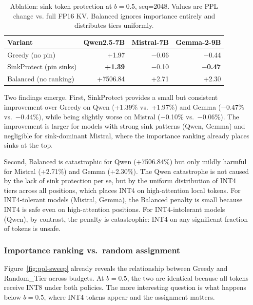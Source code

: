 \documentclass[11pt]{article}
\newcommand{\budget}{b}
\newcommand{\pct}{\%}
\theoremstyle{plain}
\theoremstyle{definition}
\begin{document}
\begin{table}[t]
\centering
\caption{Ablation: sink token protection at $\budget=0.5$, seq=2048.  Values are PPL change vs. full FP16 KV.  Balanced ignores importance entirely and distributes tiers uniformly.}
\label{tab:ablation-sink}
\small
\begin{tabular}{lrrr}
\toprule
Variant & Qwen2.5-7B & Mistral-7B & Gemma-2-9B \\
\midrule
Greedy (no pin) & +1.97 & $-$0.06 & $-$0.44 \\
SinkProtect (pin sinks) & \textbf{+1.39} & $-$0.10 & \textbf{$-$0.47} \\
Balanced (no ranking) & +7506.84 & +2.71 & +2.30 \\
\bottomrule
\end{tabular}
\end{table}

Two findings emerge.  First, SinkProtect provides a small but consistent improvement over Greedy on Qwen (+1.39\pct{} vs.\ +1.97\pct{}) and Gemma ($-$0.47\pct{} vs.\ $-$0.44\pct{}), while being slightly worse on Mistral ($-$0.10\pct{} vs.\ $-$0.06\pct{}).  The improvement is larger for models with strong sink patterns (Qwen, Gemma) and negligible for sink-dominant Mistral, where the importance ranking already places sinks at the top.

Second, Balanced is catastrophic for Qwen (+7506.84\pct{}) but only mildly harmful for Mistral (+2.71\pct{}) and Gemma (+2.30\pct{}).  The Qwen catastrophe is not caused by the lack of sink protection per se, but by the uniform distribution of INT4 tiers across all positions, which places INT4 on high-attention local tokens.  For INT4-tolerant models (Mistral, Gemma), the Balanced penalty is small because INT4 is safe even on high-attention positions.  For INT4-intolerant models (Qwen), by contrast, the penalty is catastrophic: INT4 on any significant fraction of tokens is unsafe.

\subsubsection{Importance ranking vs.\ random assignment}
\label{sec:ablation-ranking}

Figure~\ref{fig:ppl-sweep} already reveals the relationship between Greedy and Random\_Tier across budgets.  At $\budget=0.5$, the two are identical because all tokens receive INT8 under both policies.  The more interesting question is what happens below $\budget=0.5$, where INT4 tokens appear and the assignment matters.
\end{document}
